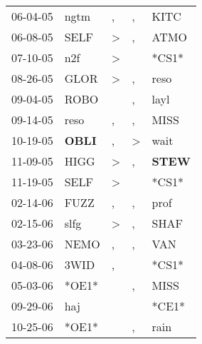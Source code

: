 \begin{supertabular}{p{0.07\textwidth}p{0.06\textwidth}p{0.02\textwidth}p{0.02\textwidth}p{0.06\textwidth}}
 06-04-05\textsuperscript{} &           ngtm\textsuperscript{} &             , &             , &           KITC\textsuperscript{} \\
 06-08-05\textsuperscript{} &           SELF\textsuperscript{} &  \textgreater &             , &           ATMO\textsuperscript{} \\
 07-10-05\textsuperscript{} &            n2f\textsuperscript{} &  \textgreater &               &                            *CS1* \\
 08-26-05\textsuperscript{} &           GLOR\textsuperscript{} &  \textgreater &             , &           reso\textsuperscript{} \\
 09-04-05\textsuperscript{} &           ROBO\textsuperscript{} &               &             , &           layl\textsuperscript{} \\
 09-14-05\textsuperscript{} &           reso\textsuperscript{} &             , &             , &           MISS\textsuperscript{} \\
 10-19-05\textsuperscript{} &  \textbf{OBLI\textsuperscript{}} &             , &  \textgreater &           wait\textsuperscript{} \\
 11-09-05\textsuperscript{} &           HIGG\textsuperscript{} &  \textgreater &             , &  \textbf{STEW\textsuperscript{}} \\
 11-19-05\textsuperscript{} &           SELF\textsuperscript{} &  \textgreater &               &                            *CS1* \\
 02-14-06\textsuperscript{} &           FUZZ\textsuperscript{} &             , &             , &           prof\textsuperscript{} \\
 02-15-06\textsuperscript{} &           slfg\textsuperscript{} &  \textgreater &             , &           SHAF\textsuperscript{} \\
 03-23-06\textsuperscript{} &           NEMO\textsuperscript{} &             , &             , &            VAN\textsuperscript{} \\
 04-08-06\textsuperscript{} &           3WID\textsuperscript{} &             , &               &                            *CS1* \\
 05-03-06\textsuperscript{} &                            *OE1* &               &             , &           MISS\textsuperscript{} \\
 09-29-06\textsuperscript{} &            haj\textsuperscript{} &               &               &                            *CE1* \\
 10-25-06\textsuperscript{} &                            *OE1* &               &             , &           rain\textsuperscript{} \\

\end{supertabular}
